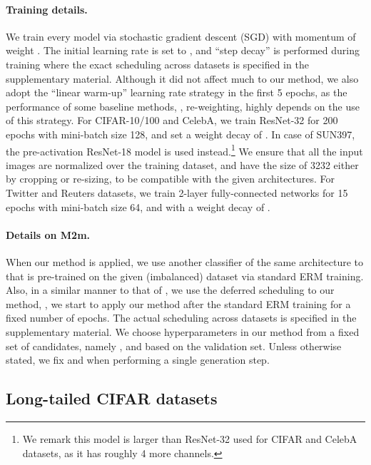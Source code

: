 \paragraph{Training details.}
We train every model via stochastic gradient descent (SGD) with momentum of weight . The initial learning rate is set to , and ``step decay'' is performed during training where the exact scheduling across datasets is specified in the supplementary material. Although it did not affect much to our method, we also adopt the ``linear warm-up'' learning rate strategy \citep{goyal2017accurate} in the first 5 epochs, as the performance of some baseline methods, \eg, re-weighting, highly depends on the use of this strategy. 
For CIFAR-10/100 and CelebA, we train ResNet-32 \citep{he2016identity} for 200 epochs with mini-batch size 128, and set a weight decay of . In case of SUN397, the pre-activation ResNet-18 model is used instead.\footnote{We remark this model is larger than ResNet-32 used for CIFAR and CelebA datasets, as it has roughly 4 more channels.}  
We ensure that all the input images are normalized over the training dataset, and have the size of 3232 either by cropping or re-sizing, to be compatible with the given architectures.
For Twitter and Reuters datasets, we train 2-layer fully-connected networks for 15 epochs with mini-batch size 64, and with a weight decay of .

\vspace{-0.15in}
\paragraph{Details on M2m.}
When our method is applied, we use another classifier  of the same architecture to  that is pre-trained on the given (imbalanced) dataset via standard ERM training.  
Also, in a similar manner to that of \citet{cao2019learning}, we use the {deferred} scheduling to our method, \ie, we start to apply our method after the standard ERM training for a fixed number of epochs. The actual scheduling across datasets is specified in the supplementary material.
We choose hyperparameters in our method from a fixed set of candidates, namely ,  and  based on the validation set. Unless otherwise stated, we fix  and  when performing a single generation step.

\subsection{Long-tailed CIFAR datasets} 

